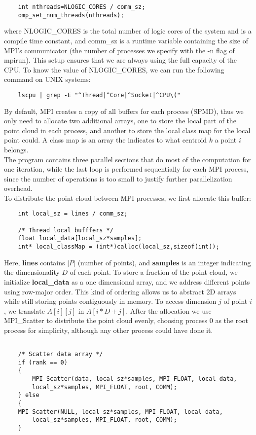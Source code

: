 \documentclass{article}
\begin{document}
\begin{lstlisting}
    int nthreads=NLOGIC_CORES / comm_sz;
    omp_set_num_threads(nthreads);
\end{lstlisting}
where NLOGIC\_CORES is the total number of logic cores of the system and is a compile time constant, and comm\_sz is a runtime variable containing the size of MPI's communicator (the number of processes we specify with the -n flag of mpirun). This setup ensures that we are always using the full capacity of the CPU. To know the value of NLOGIC\_CORES, we can run the following command on UNIX systems:
\begin{lstlisting}
    lscpu | grep -E "^Thread|^Core|^Socket|^CPU\("
\end{lstlisting}
By default, MPI creates a copy of all buffers for each process (SPMD), thus we only need to allocate two additional arrays, one to store the local part of the point cloud in each process, and another to store the local class map for the local point could. A class map is an array the indicates to what centroid $k$ a point $i$ belongs. \\The program contains three parallel sections that do most of the computation for one iteration, while the last loop is performed sequentially for each MPI process, since the number of operations is too small to justify further parallelization overhead.\\ To distribute the point cloud between MPI processes, we first allocate this buffer:
\begin{lstlisting}
    int local_sz = lines / comm_sz;

    /* Thread local bufffers */
    float local_data[local_sz*samples];
    int* local_classMap = (int*)calloc(local_sz,sizeof(int));
\end{lstlisting}
Here, \textbf{lines} contains $|P|$ (number of points), and \textbf{samples} is an integer indicating the dimensionality $D$ of each point. To store a fraction of the point cloud, we initialize \textbf{local\_data} as a one dimensional array, and we address different points using row-major order. This kind of ordering allows us to abstract 2D arrays while still storing points contiguously in memory. To access dimension $j$ of point $i$, we translate $A[i][j]$ in $A[i*D + j]$. After the allocation we use MPI\_Scatter to distribute the point cloud evenly, choosing process 0 as the root process for simplicity, although any other process could have done it.
\begin{lstlisting}

    /* Scatter data array */
    if (rank == 0)
    {
        MPI_Scatter(data, local_sz*samples, MPI_FLOAT, local_data, 
        local_sz*samples, MPI_FLOAT, root, COMM);
    } else
    {
	MPI_Scatter(NULL, local_sz*samples, MPI_FLOAT, local_data, 
        local_sz*samples, MPI_FLOAT, root, COMM);
    }
\end{lstlisting}
\end{document}
